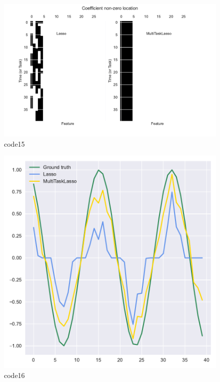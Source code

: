 \begin{PythonCode}\label{例11}
	
\end{PythonCode}

\begin{figure}[htbp]
	\centering
	\includegraphics[width=14cm]{codeimage/code15}
	\caption{code15}
	\label{code15}
\end{figure}

\begin{figure}[htbp]
	\centering
	\includegraphics[width=14cm]{codeimage/code16}
	\caption{code16}
	\label{code16}
\end{figure}

